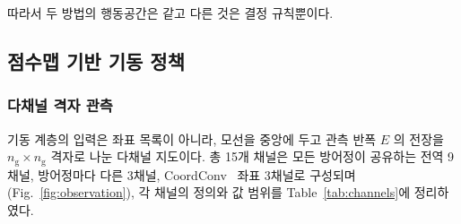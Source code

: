 따라서 두 방법의 행동공간은 같고 다른 것은 결정 규칙뿐이다.

\subsection{점수맵 기반 기동 정책}
\label{sec:policy}

\subsubsection{다채널 격자 관측}
\label{sec:obs}

기동 계층의 입력은 좌표 목록이 아니라, 모선을 중앙에 두고 관측 반폭 $E$ 의 전장을
$n_{\mathrm{g}} \times n_{\mathrm{g}}$ 격자로 나눈 다채널 지도이다. 총 15개 채널은 모든
방어정이 공유하는 전역 9채널, 방어정마다 다른 3채널, CoordConv~\citep{liu2018coordconv}
좌표 3채널로 구성되며(Fig.~\ref{fig:observation}), 각 채널의 정의와 값 범위를
Table~\ref{tab:channels}에 정리하였다.

